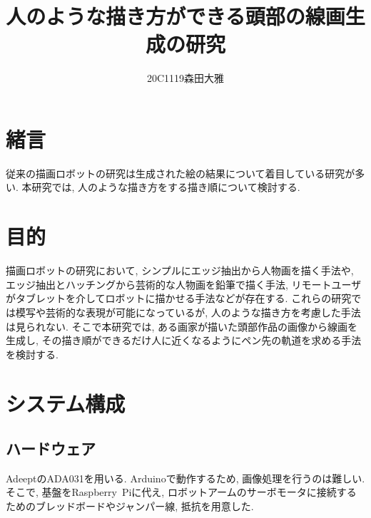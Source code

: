 \documentclass[10pt]{jarticle}
\begin{document}
    
    \makeatletter
    \title{人のような描き方ができる頭部の線画生成の研究}{}
    
    \author{20C1119\hspace{.5zw}森田大雅}
    
    \makeatother
    
    
    
    \maketitle
    
    
    \section{緒\hspace{2zw}言}%
	従来の描画ロボットの研究は生成された絵の結果について着目している研究が多い.
	本研究では, 人のような描き方をする描き順について検討する.


    \section{目的}
    
	描画ロボットの研究において, シンプルにエッジ抽出から人物画を描く手法\cite{1}や, エッジ抽出とハッチングから芸術的な人物画を鉛筆で描く手法\cite{2}, リモートユーザがタブレットを介してロボットに描かせる手法\cite{3}などが存在する.
	これらの研究では模写や芸術的な表現が可能になっているが, 人のような描き方を考慮した手法は見られない.
	そこで本研究では, ある画家が描いた頭部作品の画像から線画を生成し, その描き順ができるだけ人に近くなるようにペン先の軌道を求める手法を検討する.
    
    \section{システム構成}
	
	\subsection{ハードウェア}
	AdeeptのADA031を用いる. Arduinoで動作するため, 画像処理を行うのは難しい.
	そこで, 基盤をRaspberry\ Piに代え, ロボットアームのサーボモータに接続するためのブレッドボードやジャンパー線, 抵抗を用意した.
	
\end{document}
